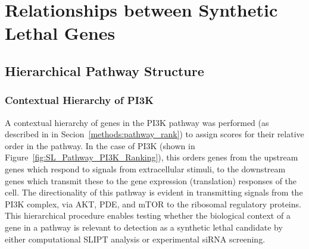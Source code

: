 \begin{table*}[!htb]
\caption{\gls{ANOVA} for Synthetic Lethality and PageRank Centrality}
\label{tab:SL_Pathway_PI3K_PageRank}
\noindent{}
\end{table*}

\FloatBarrier

\section{Relationships between Synthetic Lethal Genes}

\FloatBarrier

\subsection{Hierarchical Pathway Structure}

\subsubsection{Contextual Hierarchy of PI3K}  \label{chapt4:Network_Hierachy}

\FloatBarrier

A contextual hierarchy of genes in the PI3K pathway was performed (as described in in Secion~\ref{methods:pathway_rank}) to assign scores for their relative order in the pathway. In the case of PI3K (shown in Figure~\ref{fig:SL_Pathway_PI3K_Ranking}), this orders genes from the upstream genes which respond to signals from extracellular stimuli, to the downstream genes which transmit these to the gene expression (translation) responses of the cell. The directionality of this pathway is evident in transmitting signals from the \gls{PI3K} complex, via AKT, \gls{PDE}, and mTOR to the ribosomal regulatory proteins. This hierarchical procedure enables testing whether the biological context of a gene in a pathway is relevant to detection as a synthetic lethal candidate by either computational \gls{SLIPT} analysis or experimental \gls{siRNA} screening.

